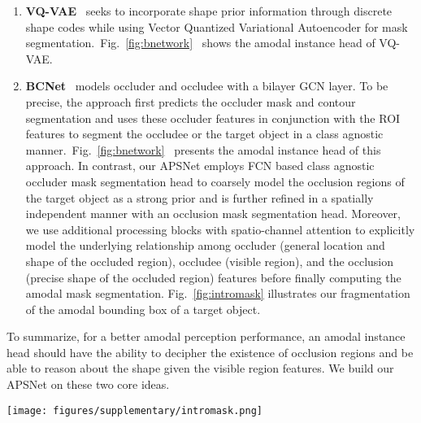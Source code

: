 \documentclass[10pt,twocolumn,letterpaper]{article}
\newcommand{\figref}[1]{Fig.~\ref{#1}}
\begin{document}
\begin{enumerate}[noitemsep]
\item \textbf{VQ-VAE}~\cite{jang2020learning} seeks to incorporate shape prior information through discrete shape codes while using Vector Quantized Variational Autoencoder for mask segmentation.~\figref{fig:bnetwork}~ shows the amodal instance head of VQ-VAE. 

\item \textbf{BCNet}~\cite{Ke_2021_CVPR} models occluder and occludee with a bilayer GCN layer. To be precise, the approach first predicts the occluder mask and contour segmentation and uses these occluder features in conjunction with the ROI features to segment the occludee or the target object in a class agnostic manner.~\figref{fig:bnetwork}~ presents the amodal instance head of this approach. In contrast, our APSNet employs FCN based class agnostic occluder mask segmentation head to coarsely model the occlusion regions of the target object as a strong prior and is further refined in a spatially independent manner with an occlusion mask segmentation head. Moreover, we use additional processing blocks with spatio-channel attention to explicitly model the underlying relationship among occluder (general location and shape of the occluded region), occludee (visible region), and the occlusion (precise shape of the occluded region) features before finally computing the amodal mask segmentation. \figref{fig:intromask} illustrates our fragmentation of the amodal bounding box of a target object.

\end{enumerate}

To summarize, for a better amodal perception performance, an amodal instance head should have the ability to decipher the existence of occlusion regions and be able to reason about the shape given the visible region features. We build our APSNet on these two core ideas.

\begin{figure*}
\centering
\texttt{[image: figures/supplementary/intromask.png]}
\caption{Illustration of our fragmentation of bounding box of the target object into class-agnostic occluder, class-wise occlusion, and visible masks. Our amodal instance head employs individual mask heads to predict each mask. The features from these mask heads are further processed with a series of convolution operations along with spatio-channel attention to predict the amodal mask of the target object.}
\label{fig:intromask}
\end{figure*}
\end{document}
